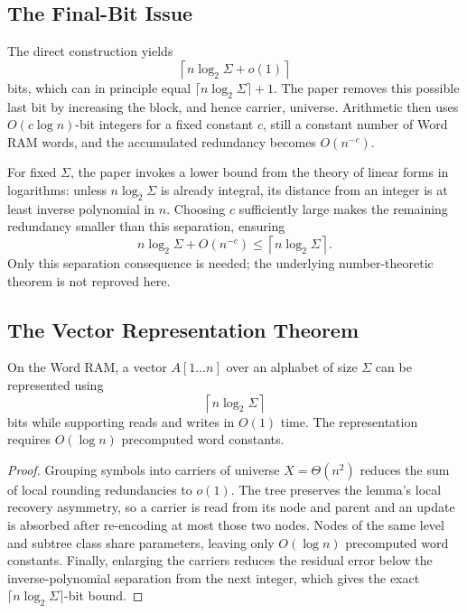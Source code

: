 \subsection{The Final-Bit Issue}

The direct construction yields
\[
    \left\lceil n\log_2\Sigma+o(1)\right\rceil
\]
bits, which can in principle equal
\(\lceil n\log_2\Sigma\rceil+1\). The paper removes this possible last bit by
increasing the block, and hence carrier, universe. Arithmetic then uses
\(O(c\log n)\)-bit integers for a fixed constant \(c\), still a constant
number of Word RAM words, and the accumulated redundancy becomes
\(O(n^{-c})\).

For fixed \(\Sigma\), the paper invokes a lower bound from the theory of
linear forms in logarithms: unless \(n\log_2\Sigma\) is already integral, its
distance from an integer is at least inverse polynomial in \(n\). Choosing
\(c\) sufficiently large makes the remaining redundancy smaller than this
separation, ensuring
\[
    n\log_2\Sigma+O(n^{-c})
    \leq
    \left\lceil n\log_2\Sigma\right\rceil.
\]
Only this separation consequence is needed; the underlying number-theoretic
theorem is not reproved here.

\subsection{The Vector Representation Theorem}

\begin{theorem}
\label{thm:vector-representation}
On the Word RAM, a vector \(A[1\ldots n]\) over an alphabet of size
\(\Sigma\) can be represented using
\[
    \left\lceil n\log_2\Sigma\right\rceil
\]
bits while supporting reads and writes in \(O(1)\) time. The representation
requires \(O(\log n)\) precomputed word constants.
\end{theorem}

\begin{proof}
Grouping symbols into carriers of universe \(X=\Theta(n^2)\) reduces the sum
of local rounding redundancies to \(o(1)\). The tree preserves the lemma's
local recovery asymmetry, so a carrier is read from its node and parent and
an update is absorbed after re-encoding at most those two nodes. Nodes of the
same level and subtree class share parameters, leaving only \(O(\log n)\)
precomputed word constants. Finally, enlarging the carriers reduces the
residual error below the inverse-polynomial separation from the next integer,
which gives the exact \(\lceil n\log_2\Sigma\rceil\)-bit bound.
\end{proof}
